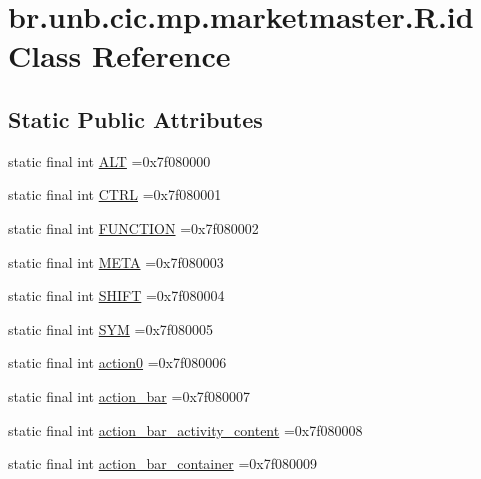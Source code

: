 \hypertarget{classbr_1_1unb_1_1cic_1_1mp_1_1marketmaster_1_1R_1_1id}{}\section{br.\+unb.\+cic.\+mp.\+marketmaster.\+R.\+id Class Reference}
\label{classbr_1_1unb_1_1cic_1_1mp_1_1marketmaster_1_1R_1_1id}
\subsection*{Static Public Attributes}
\begin{DoxyCompactItemize}
\item 
static final int \mbox{\hyperlink{classbr_1_1unb_1_1cic_1_1mp_1_1marketmaster_1_1R_1_1id_ae9983be99f3c8db80b1748124157efd4}{A\+LT}} =0x7f080000
\item 
static final int \mbox{\hyperlink{classbr_1_1unb_1_1cic_1_1mp_1_1marketmaster_1_1R_1_1id_afb6728d8e55678016038377b4c2bf8ab}{C\+T\+RL}} =0x7f080001
\item 
static final int \mbox{\hyperlink{classbr_1_1unb_1_1cic_1_1mp_1_1marketmaster_1_1R_1_1id_a5cfdb00465471bbc3003d7b6e2151e75}{F\+U\+N\+C\+T\+I\+ON}} =0x7f080002
\item 
static final int \mbox{\hyperlink{classbr_1_1unb_1_1cic_1_1mp_1_1marketmaster_1_1R_1_1id_a6b2b6e6f0d17a8a31a2350a137b33c8e}{M\+E\+TA}} =0x7f080003
\item 
static final int \mbox{\hyperlink{classbr_1_1unb_1_1cic_1_1mp_1_1marketmaster_1_1R_1_1id_a955aabd853769bb170e4fe67e0b84c56}{S\+H\+I\+FT}} =0x7f080004
\item 
static final int \mbox{\hyperlink{classbr_1_1unb_1_1cic_1_1mp_1_1marketmaster_1_1R_1_1id_aaaefaa89049b4fab5cb1b13d1030f754}{S\+YM}} =0x7f080005
\item 
static final int \mbox{\hyperlink{classbr_1_1unb_1_1cic_1_1mp_1_1marketmaster_1_1R_1_1id_a1d0567a87d8677fe5f20bdfdfaa78dd0}{action0}} =0x7f080006
\item 
static final int \mbox{\hyperlink{classbr_1_1unb_1_1cic_1_1mp_1_1marketmaster_1_1R_1_1id_ad276f9cd616173b02a1c2e5149965acb}{action\+\_\+bar}} =0x7f080007
\item 
static final int \mbox{\hyperlink{classbr_1_1unb_1_1cic_1_1mp_1_1marketmaster_1_1R_1_1id_a721c9035d840f66c25c4b61e69a90a58}{action\+\_\+bar\+\_\+activity\+\_\+content}} =0x7f080008
\item 
static final int \mbox{\hyperlink{classbr_1_1unb_1_1cic_1_1mp_1_1marketmaster_1_1R_1_1id_a7b44de8214e0b489176aaf00b07adf52}{action\+\_\+bar\+\_\+container}} =0x7f080009

\end{DoxyCompactItemize}
